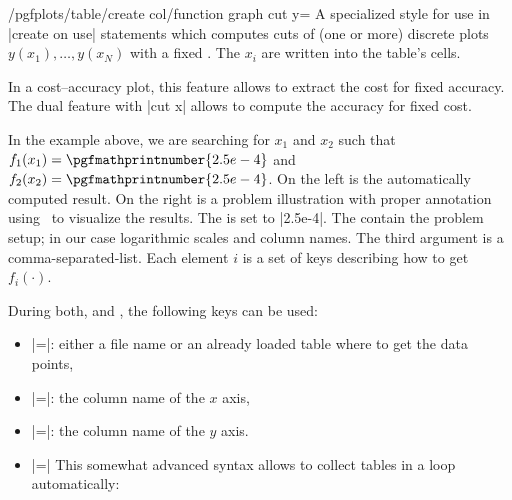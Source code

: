 \begin{stylekey}{/pgfplots/table/create col/function graph cut y=}
	A specialized style for use in |create on use| statements which computes cuts of (one or more) discrete plots $y(x_1), \dotsc, y(x_N)$ with a fixed . The $x_i$ are written into the table's cells.

	In a cost--accuracy plot, this feature allows to extract the cost for fixed accuracy. The dual feature with |cut x| allows to compute the accuracy for fixed cost.
	
	\pgfplotsset{anchor=center,/tikz/baseline}
\begin{codeexample}[]
	\table

\pgfplotstabletypeset{\table}

\end{codeexample}
	In the example above, we are searching for $x_1$ and $x_2$ such that $f_1(x_1) = \pgfmathprintnumber{2.5e-4}$ and $f_2(x_2) =\pgfmathprintnumber{2.5e-4}$. On the left is the automatically computed result. On the right is a problem illustration with proper annotation using \PGFPlots\ to visualize the results.
	The  is set to |2.5e-4|. The  contain the problem setup; in our case logarithmic scales and column names. The third argument is a comma-separated-list. Each element $i$ is a set of keys describing how to get $f_i(\cdot)$.

	During both,  and , the following keys can be used:
	\begin{itemize}
		\item {}|=|: either a file name or an already loaded table where to get the data points,
		\item {}|=|: the column name of the $x$ axis,
		\item {}|=|: the column name of the $y$ axis.
		\item {}|=|
			This somewhat advanced syntax allows to collect tables in a loop automatically:


\end{itemize}
\end{stylekey}
